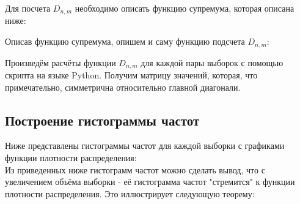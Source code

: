 \documentclass[14pt,a4paper,oneside]{extbook}
\begin{document}
    Для посчета $D_{n, m}$ необходимо описать функцию супремума, которая описана ниже:
    
    
    Описав функцию супремума, опишем и саму функцию подсчета $D_{n, m}$: 
    
    
    Произведём расчёты функции $D_{n,m}$ для каждой пары выборок с помощью скрипта на языке Python. Получим матрицу значений, которая, что примечательно, симметрична относительно главной диагонали.
    
    \begin{center}
    \end{center}
    
    \subsection{Построение гистограммы частот}
     Ниже представлены гистограммы частот для каждой выборки с графиками функции плотности распределения: \\
      Из приведенных ниже гистограмм частот можно сделать вывод, что с увеличением объёма выборки - её гистограмма частот "стремится" к функции плотности распределения. Это иллюстрирует следующую теорему:\\
      
\end{document}

